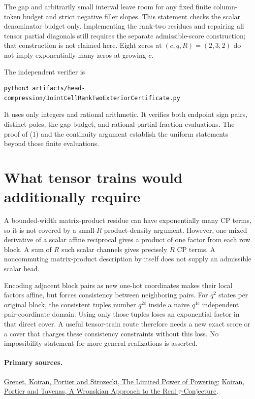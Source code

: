 \documentclass{article}
\begin{document}
The gap and arbitrarily small interval leave room for any fixed finite
column-token budget and strict negative filler slopes.  This statement
checks the scalar denominator budget only.  Implementing the rank-two
residues and repairing all tensor partial diagonals still requires the
separate admissible-score construction; that construction is not claimed
here.  Eight zeros at $(c,q,R)=(2,3,2)$ do not imply exponentially many
zeros at growing $c$.

The independent verifier is
\begin{verbatim}
python3 artifacts/head-compression/JointCellRankTwoExteriorCertificate.py
\end{verbatim}
It uses only integers and rational arithmetic.  It verifies both endpoint
sign pairs, distinct poles, the gap budget, and rational partial-fraction
evaluations.  The proof of (1) and the continuity argument establish the
uniform statements beyond those finite evaluations.

\section{What tensor trains would additionally require}

A bounded-width matrix-product residue can have exponentially many CP
terms, so it is not covered by a small-$R$ product-density argument.
However, one mixed derivative of a scalar affine reciprocal gives a
product of one factor from each row block.  A sum of $R$ such scalar
channels gives precisely $R$ CP terms.  A noncommuting matrix-product
description by itself does not supply an admissible scalar head.

Encoding adjacent block pairs as new one-hot coordinates makes their
local factors affine, but forces consistency between neighboring pairs.
For $q^2$ states per original block, the consistent tuples number
$q^{2c}$ inside a naive $q^{4c}$ independent pair-coordinate domain.
Using only those tuples loses an exponential factor in that direct
cover.  A useful tensor-train route therefore needs a new exact score or
a cover that charges these consistency constraints without this loss.
No impossibility statement for more general realizations is asserted.

\paragraph{Primary sources.}
\href{https://www-verimag.imag.fr/~grenetb/publis/GKPS11.pdf}
{Grenet, Koiran, Portier and Strozecki, The Limited Power of Powering};
\href{https://arxiv.org/pdf/1205.1015}
{Koiran, Portier and Tavenas, A Wronskian Approach to the Real
\(\tau\)-Conjecture}.
\end{document}
